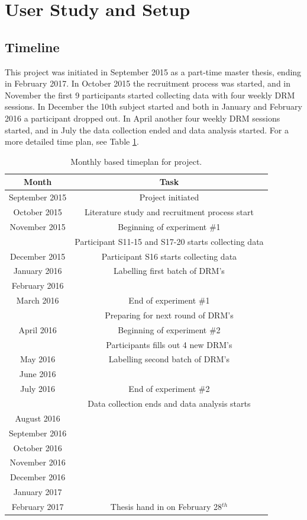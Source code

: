 \documentclass[12pt]{article} %
\begin{document}
\newpage 
\section{User Study and Setup}
\subsection{Timeline}
This project was initiated in September 2015 as a part-time master thesis, ending in February 2017. In October 2015 the recruitment process was started, and in November the first 9 participants started collecting data with four weekly DRM sessions. In December the 10th subject started and both in January and February 2016 a participant dropped out. In April another four weekly DRM sessions started, and in July the data collection ended and data analysis started. For a more detailed time plan, see Table \ref{tab:timeplan}. 

\begin{table}[H]
\center
\begin{footnotesize}
	\begin{tabular}{| c | c |}
	\hline
	\textbf{Month} & \textbf{Task} \\
	\hline
	September 2015 & Project initiated\\
	October 2015 & Literature study and recruitment process start\\
	November 2015 & Beginning of experiment \#1 \\
	 & Participant S11-15 and S17-20 starts collecting data \\
	December 2015 & Participant S16 starts collecting data\\
	January 2016 & Labelling first batch of DRM's \\
	February 2016 & \\
	March 2016 & End of experiment \#1 \\
	 & Preparing for next round of DRM's \\
	April 2016 & Beginning of experiment \#2 \\
	 & Participants fills out 4 new DRM's \\
	May 2016 & Labelling second batch of DRM's\\
	June 2016 & \\
	July 2016 & End of experiment \#2 \\
	 & Data collection ends and data analysis starts\\
	August 2016 & \\
	September 2016 & \\
	October 2016 & \\
	November 2016 & \\
	December 2016 & \\
	January 2017 & \\
	February 2017 & Thesis hand in on February 28$^{th}$\\
	\hline
	\end{tabular}
	\caption{Monthly based timeplan for project.}
	\label{tab:timeplan}
\end{footnotesize}
\end{table}
\end{document}
